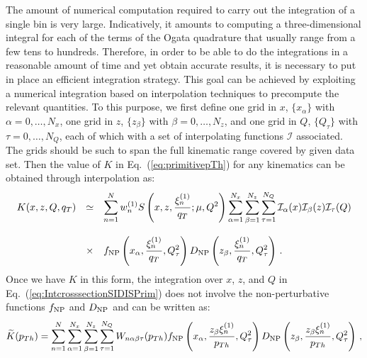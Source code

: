 \documentclass[10pt,a4paper]{article}
\begin{document}
The amount of numerical computation required to carry out the
integration of a single bin is very large. Indicatively, it amounts to
computing a three-dimensional integral for each of the terms of the
Ogata quadrature that usually range from a few tens to
hundreds. Therefore, in order to be able to do the integrations in a
reasonable amount of time and yet obtain accurate results, it is
necessary to put in place an efficient integration strategy. This goal
can be achieved by exploiting a numerical integration based on
interpolation techniques to precompute the relevant quantities. To
this purpose, we first define one grid in $x$, $\{x_\alpha\}$ with
$\alpha=0,\dots,N_x$, one grid in $z$, $\{z_\beta\}$ with
$\beta=0,\dots,N_z$, and one grid in $Q$, $\{Q_\tau\}$ with
$\tau=0,\dots,N_Q$, each of which with a set of interpolating
functions $\mathcal{I}$ associated. The grids should be such to span
the full kinematic range covered by given data set. Then the value of
$K$ in Eq.~(\ref{eq:primitivepTh}) for any kinematics can be obtained
through interpolation as:
\begin{equation}
\begin{array}{rcl}
\displaystyle K(x,z,Q,q_T) &\simeq& \displaystyle 
  \sum_{n=1}^N w_n^{(1)} S\left(x,z,\frac{\xi_n^{(1)}}{q_T};\mu,Q^2\right)
         \sum_{\alpha=1}^{N_x}\sum_{\beta=1}^{N_z}\sum_{\tau=1}^{N_Q}\mathcal{I}_\alpha(x)\mathcal{I}_\beta(z)\mathcal{I}_\tau(Q) \\
\\
&\times&\displaystyle f_{\rm NP}\left(x_\alpha, \frac{\xi_n^{(1)}}{ q_{T}},Q_\tau^2\right) D_{\rm NP}\left(z_\beta, \frac{\xi_n^{(1)}}{q_{T}},Q_\tau^2\right)\,.
\end{array}
\end{equation}
Once we have $K$ in this form, the integration over $x$, $z$, and $Q$
in Eq.~(\ref{eq:IntcrosssectionSIDISPrim}) does not involve the
non-perturbative functions $f_{\rm NP}$ and $D_{\rm NP}$ and can be
written as:
\begin{equation}
  \widetilde{K}(p_{Th}) = \sum_{n=1}^N 
                                                 \sum_{\alpha=1}^{N_x}\sum_{\beta=1}^{N_z}\sum_{\tau=1}^{N_Q}
                                                 W_{n\alpha\beta\tau}(p_{Th})
                                                 f_{\rm
                                                   NP}\left(x_\alpha,
                                                   \frac{z_\beta\xi_n^{(1)}}{p_{Th}},Q_\tau^2\right)
                                                 D_{\rm
                                                   NP}\left(z_\beta,
                                                   \frac{z_\beta\xi_n^{(1)}}{p_{Th}},Q_\tau^2\right)\,,
\label{eq:numintDIS}
\end{equation}
\end{document}

